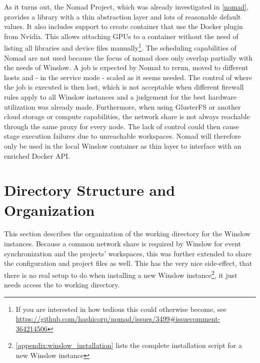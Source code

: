 As it turns out, the Nomad Project, which was already investigated in \autoref{nomad}, provides a library with a thin abstraction layer and lots of reasonable default values.
It also includes support to create container that use the Docker plugin from Nvidia\cite{nvidia:docker_plugin}.
This allows attaching GPUs to a container without the need of listing all libraries and device files manually\footnote{If you are interested in how tedious this could otherwise become, see \url{https://github.com/hashicorp/nomad/issues/3499\#issuecomment-364214506}}.
The scheduling capabilities of Nomad are not used because the focus of nomad does only overlap partially with the needs of Winslow.
A job is expected by Nomad to rerun, moved to different hosts and - in the service mode - scaled as it seems needed.
The control of where the job is executed is then lost, which is not acceptable when different firewall rules apply to all Winslow instances and a judgement for the best hardware utilization was already made.
Furthermore, when using GlusterFS or another cloud storage or compute capabilities, the network share is not always reachable through the same proxy for every node.
The lack of control could then cause stage execution failures due to unreachable workspaces.
Nomad will therefore only be used in the local Winslow container as thin layer to interface with an enriched Docker API.



\section{Directory Structure and Organization}

This section describes the organization of the working directory for the Winslow instances.
Because a common network share is required by Winslow for event synchronization and the projects' workspaces, this was further extended to share the configuration and project files as well.
This has the very nice side-effect, that there is no real setup to do when installing a new Winslow instance\footnote{\autoref{appendix:winslow_installation} lists the complete installation script for a new Winslow instance}, it just needs access the to working directory.

